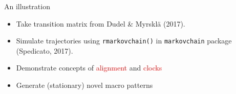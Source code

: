 \documentclass[20pt,usenames,dvipsnames]{beamer}
\begin{document}
\begin{frame}[plain]
\Large
\centering
An illustration
\pause
\begin{itemize}[<+->]
  \item Take transition matrix from \normalsize{Dudel \& Myrskl\"a (2017)}.
  \item Simulate trajectories using \texttt{rmarkovchain()} in \texttt{markovchain}
  package \normalsize{(Spedicato, 2017)}.
  \item Demonstrate concepts of \textcolor{red}{alignment} and \textcolor{red}{clocks}
  \item Generate (stationary) novel macro patterns
\end{itemize}
\end{frame}

%
%
%
\end{document}
